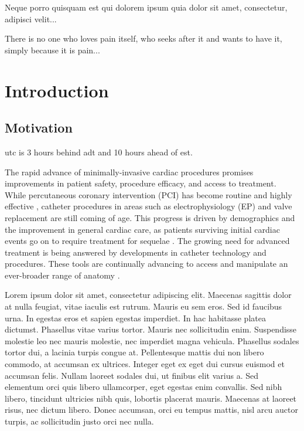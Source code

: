 \begin{savequote}[8cm]
\textlatin{Neque porro quisquam est qui dolorem ipsum quia dolor sit amet, consectetur, adipisci velit...}

There is no one who loves pain itself, who seeks after it and wants to have it, simply because it is pain...
\end{savequote}

\chapter{\label{ch:1-intro}Introduction} 

\minitoc

\section{Motivation}
\gls{utc} is 3 hours behind \gls{adt} and 10 hours ahead of \gls{est}.

The rapid advance of minimally-invasive cardiac procedures promises improvements in patient safety, procedure efficacy, and access to treatment.  While percutaneous coronary intervention (PCI) has become routine and highly effective \cite{bravata_systematic_2007}, catheter procedures in areas such as electrophysiology (EP) and valve replacement are still coming of age.  This progress is driven by demographics and the improvement in general cardiac care, as patients surviving initial cardiac events go on to require treatment for sequelae \cite{foot_demographics_2000}.  The growing need for advanced treatment is being answered by developments in catheter technology and procedures.  These tools are continually advancing to access and manipulate an ever-broader range of anatomy \cite{sousa_new_2005}.

Lorem ipsum dolor sit amet, consectetur adipiscing elit. Maecenas sagittis dolor at nulla feugiat, vitae iaculis est rutrum. Mauris eu sem eros. Sed id faucibus urna. In egestas eros et sapien egestas imperdiet. In hac habitasse platea dictumst. Phasellus vitae varius tortor. Mauris nec sollicitudin enim. Suspendisse molestie leo nec mauris molestie, nec imperdiet magna vehicula. Phasellus sodales tortor dui, a lacinia turpis congue at. Pellentesque mattis dui non libero commodo, at accumsan ex ultrices. Integer eget ex eget dui cursus euismod et accumsan felis. Nullam laoreet sodales dui, ut finibus elit varius a. Sed elementum orci quis libero ullamcorper, eget egestas enim convallis. Sed nibh libero, tincidunt ultricies nibh quis, lobortis placerat mauris. Maecenas at laoreet risus, nec dictum libero. Donec accumsan, orci eu tempus mattis, nisl arcu auctor turpis, ac sollicitudin justo orci nec nulla.

